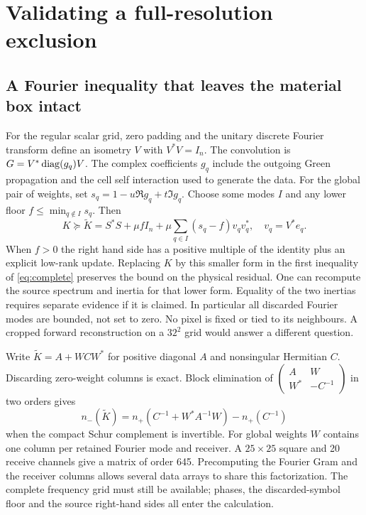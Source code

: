 \documentclass[anonymous,12pt]{iopjournal}
\theoremstyle{remark}\newtheorem{remark}[theorem]{Remark}
\numberwithin{equation}{section}
\begin{document}
\section{Validating a full-resolution exclusion}\label{sec:fourier}

\subsection{A Fourier inequality that leaves the material box intact}
For the regular scalar grid, zero padding and the unitary discrete Fourier transform define an isometry $V$ with $V^*V=I_n$. The convolution is $G=V^*\operatorname{diag}(g_q)V$. The complex coefficients $g_q$ include the outgoing Green propagation and the cell self interaction used to generate the data. For the global pair of weights, set $s_q=1-u\Re g_q+t\Im g_q$. Choose some modes $I$ and any lower floor $f\le\min_{q\notin I}s_q$. Then
\begin{equation}
 K\succeq \widetilde K=S^*S+\mu f I_n+
                  \mu\sum_{q\in I}(s_q-f)v_qv_q^*,\quad v_q=V^*e_q.
 \label{eq:fourfloor}
\end{equation}
When $f>0$ the right hand side has a positive multiple of the identity plus an explicit low-rank update. Replacing $K$ by this smaller form in the first inequality of \eqref{eq:complete} preserves the bound on the physical residual. One can recompute the source spectrum and inertia for that lower form. Equality of the two inertias requires separate evidence if it is claimed. In particular all discarded Fourier modes are bounded, not set to zero. No pixel is fixed or tied to its neighbours. A cropped forward reconstruction on a $32^2$ grid would answer a different question.

Write $\widetilde K=A+W C W^*$ for positive diagonal $A$ and nonsingular Hermitian $C$. Discarding zero-weight columns is exact. Block elimination of $\left(\begin{smallmatrix}A&W\\W^*&-C^{-1}\end{smallmatrix}\right)$ in two orders gives
\begin{equation}
 n_-(\widetilde K)=n_+(C^{-1}+W^*A^{-1}W)-n_+(C^{-1})\label{eq:smallin}
\end{equation}
when the compact Schur complement is invertible. For global weights $W$ contains one column per retained Fourier mode and receiver. A $25\times25$ square and 20 receive channels give a matrix of order 645. Precomputing the Fourier Gram and the receiver columns allows several data arrays to share this factorization. The complete frequency grid must still be available; phases, the discarded-symbol floor and the source right-hand sides all enter the calculation.
\end{document}

